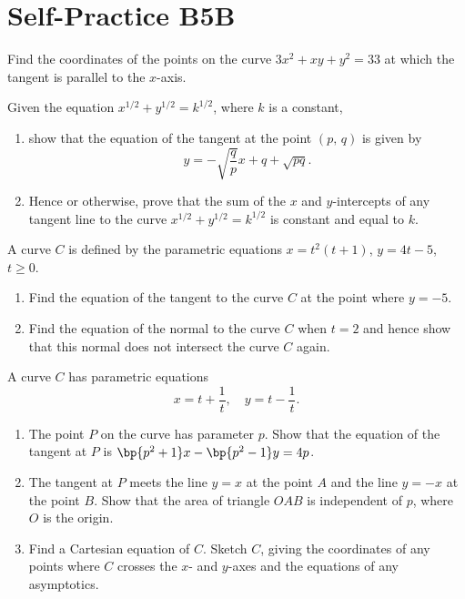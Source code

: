 \section{Self-Practice B5B}

\begin{problem}
    Find the coordinates of the points on the curve $3x^{2}+xy+y^{2}=33$ at which the tangent is parallel to the $x$-axis.
\end{problem}

\begin{problem}
    Given the equation $x^{1/2}+y^{1/2}=k^{1/2}$, where $k$ is a constant,
    \begin{enumerate}
        \item show that the equation of the tangent at the point $(p,\,q)$ is given by \[y = -\sqrt{\frac{q}{p}} x + q + \sqrt{pq}.\]
        \item Hence or otherwise, prove that the sum of the $x$ and $y$-intercepts of any tangent line to the curve $x^{1/2}+y^{1/2}=k^{1/2}$ is constant and equal to $k$.
    \end{enumerate}
\end{problem}

\begin{problem}
    A curve $C$ is defined by the parametric equations $x=t^{2}(t+1)$, $y=4t-5$, $t\geq0$.

    \begin{enumerate}
        \item Find the equation of the tangent to the curve $C$ at the point where $y=-5$.
        \item Find the equation of the normal to the curve $C$ when $t=2$ and hence show that this normal does not intersect the curve $C$ again.
    \end{enumerate}
\end{problem}

\begin{problem}
    A curve $C$ has parametric equations \[x = t + \frac1t, \quad y = t - \frac1t.\]

    \begin{enumerate}
        \item The point $P$ on the curve has parameter $p$. Show that the equation of the tangent at $P$ is $\bp{p^2 + 1} x - \bp{p^2 - 1} y = 4p$.
        \item The tangent at $P$ meets the line $y=x$ at the point $A$ and the line $y=-x$ at the point $B$. Show that the area of triangle $OAB$ is independent of $p$, where $O$ is the origin.
        \item Find a Cartesian equation of $C$. Sketch $C$, giving the coordinates of any points where $C$ crosses the $x$- and $y$-axes and the equations of any asymptotics.
    \end{enumerate}
\end{problem}

